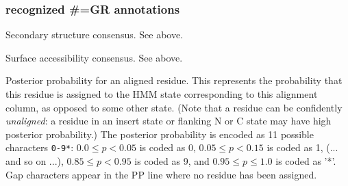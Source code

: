 \subsubsection{recognized \#=GR annotations}
\begin{sreitems}{}
\item [\emprog{SS}]
        Secondary structure consensus. See  above.
\item [\emprog{SA}]
        Surface accessibility consensus. See  above.
\item [\emprog{PP}] Posterior probability for an aligned residue. This
  represents the probability that this residue is assigned to the HMM
  state corresponding to this alignment column, as opposed to some
  other state. (Note that a residue can be confidently
  \emph{unaligned}: a residue in an insert state or flanking N or C
  state may have high posterior probability.) The posterior
  probability is encoded as 11 possible characters \verb+0-9*+: $0.0
  \leq p < 0.05$ is coded as 0, $0.05 \leq p < 0.15$ is coded as 1,
  (... and so on ...), $0.85 \leq p < 0.95$ is coded as 9, and $0.95
  \leq p \leq 1.0$ is coded as '*'. Gap characters appear in the PP
  line where no residue has been assigned.
\end{sreitems}

